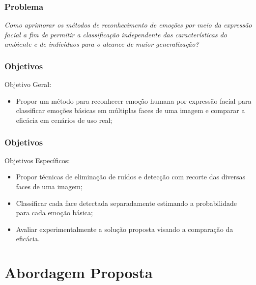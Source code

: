 \documentclass{beamer}
\begin{document}

\begin{frame}
\frametitle{Problema}
\pause
\textit{Como aprimorar os métodos de reconhecimento de emoções por meio da expressão facial a fim de permitir a classificação independente das características do ambiente e de indivíduos para o alcance de maior generalização?} 


\end{frame}


\begin{frame}
\frametitle{Objetivos}
\begin{block}{Objetivo Geral:}
\begin{itemize}
\pause
\item Propor um método para reconhecer emoção humana por expressão facial para classificar emoções básicas em múltiplas faces de uma imagem e comparar a eficácia em cenários de uso real;
\end{itemize}
\end{block}


\frametitle{Objetivos}
\begin{block}{Objetivos Específicos:}
\begin{itemize}
\pause
 \item Propor técnicas de eliminação de ruídos e detecção com recorte das diversas faces de uma imagem;
 \pause
 \item Classificar cada face detectada separadamente estimando a probabilidade para cada emoção básica;
 \pause
 \item Avaliar experimentalmente a solução proposta visando a comparação da eficácia.
\end{itemize}
\end{block}
\end{frame}



\section{Abordagem Proposta}
\end{document}
